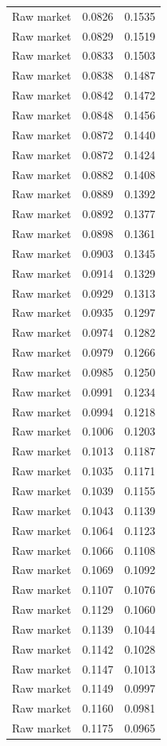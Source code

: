 \begin{table}[htbp]
\begin{tabular}{lll}
Raw market & 0.0826 & 0.1535 \\
Raw market & 0.0829 & 0.1519 \\
Raw market & 0.0833 & 0.1503 \\
Raw market & 0.0838 & 0.1487 \\
Raw market & 0.0842 & 0.1472 \\
Raw market & 0.0848 & 0.1456 \\
Raw market & 0.0872 & 0.1440 \\
Raw market & 0.0872 & 0.1424 \\
Raw market & 0.0882 & 0.1408 \\
Raw market & 0.0889 & 0.1392 \\
Raw market & 0.0892 & 0.1377 \\
Raw market & 0.0898 & 0.1361 \\
Raw market & 0.0903 & 0.1345 \\
Raw market & 0.0914 & 0.1329 \\
Raw market & 0.0929 & 0.1313 \\
Raw market & 0.0935 & 0.1297 \\
Raw market & 0.0974 & 0.1282 \\
Raw market & 0.0979 & 0.1266 \\
Raw market & 0.0985 & 0.1250 \\
Raw market & 0.0991 & 0.1234 \\
Raw market & 0.0994 & 0.1218 \\
Raw market & 0.1006 & 0.1203 \\
Raw market & 0.1013 & 0.1187 \\
Raw market & 0.1035 & 0.1171 \\
Raw market & 0.1039 & 0.1155 \\
Raw market & 0.1043 & 0.1139 \\
Raw market & 0.1064 & 0.1123 \\
Raw market & 0.1066 & 0.1108 \\
Raw market & 0.1069 & 0.1092 \\
Raw market & 0.1107 & 0.1076 \\
Raw market & 0.1129 & 0.1060 \\
Raw market & 0.1139 & 0.1044 \\
Raw market & 0.1142 & 0.1028 \\
Raw market & 0.1147 & 0.1013 \\
Raw market & 0.1149 & 0.0997 \\
Raw market & 0.1160 & 0.0981 \\
Raw market & 0.1175 & 0.0965 \\

\end{tabular}
\end{table}
